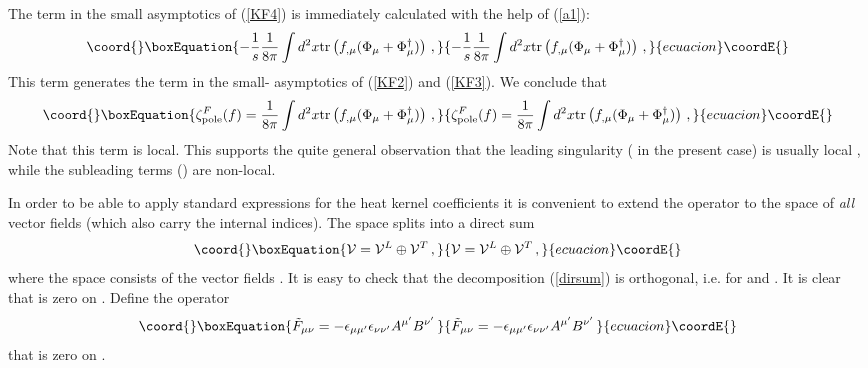 \documentclass[a4paper,12pt]{article}
\begin{document}
The \coordHE{} term in the small \coordHE{} asymptotics of (\ref{KF4})
is immediately calculated with the help of (\ref{a1}):
\begin{equation}\coord{}\boxEquation{
-\frac 1s \frac 1{8\pi} \int d^2x 
{\rm tr}\left( f_{,\mu}(\Phi_{\mu}+\Phi_\mu^\dag )\right)\,,
\label{1s}
}{
-\frac 1s \frac 1{8\pi} \int d^2x 
{\rm tr}\left( f_{,\mu}(\Phi_{\mu}+\Phi_\mu^\dag )\right)\,,
}{ecuacion}\coordE{}\end{equation}
This term generates the \coordHE{} term in the small-\coordHE{}
asymptotics of (\ref{KF2}) and (\ref{KF3}). We conclude that
\begin{equation}\coord{}\boxEquation{
\zeta^F_{\mbox{\scriptsize pole}}(f)= \frac 1{8\pi} \int d^2x 
{\rm tr}\left( f_{,\mu}(\Phi_{\mu}+\Phi_\mu^\dag )\right)\,,
\label{logt}
}{
\zeta^F_{\mbox{\scriptsize pole}}(f)= \frac 1{8\pi} \int d^2x 
{\rm tr}\left( f_{,\mu}(\Phi_{\mu}+\Phi_\mu^\dag )\right)\,,
}{ecuacion}\coordE{}\end{equation}
Note that this term is local. This supports the quite
general observation that the leading singularity 
(\coordHE{} in the present case) is usually local , while
the subleading terms (\coordHE{}) are non-local.

In order to be able to apply standard expressions for the
heat kernel coefficients it is convenient to extend the
operator \coordHE{} to the space \coordHE{} of {\it all}
vector fields (which also carry the internal indices). 
The space \coordHE{} splits into a
direct sum
\begin{equation}\coord{}\boxEquation{
{\cal V}={\cal V}^L\oplus {\cal V}^T \,,
\label{dirsum}
}{
{\cal V}={\cal V}^L\oplus {\cal V}^T \,,
}{ecuacion}\coordE{}\end{equation}
where the space \coordHE{} consists of the vector
fields \coordHE{}. It is easy
to check that the decomposition (\ref{dirsum}) is orthogonal,
i.e. \coordHE{} for \coordHE{}
and \coordHE{}. It is clear that \coordHE{} is zero on
\coordHE{}. Define the operator
\begin{equation}\coord{}\boxEquation{
\tilde F_{\mu\nu}=-\epsilon_{\mu\mu'}\epsilon_{\nu\nu'}
A^{\mu'}B^{\nu'} \, \label{defFtil}
}{
\tilde F_{\mu\nu}=-\epsilon_{\mu\mu'}\epsilon_{\nu\nu'}
A^{\mu'}B^{\nu'} \, }{ecuacion}\coordE{}\end{equation}
that is zero on \coordHE{}.
\end{document}
